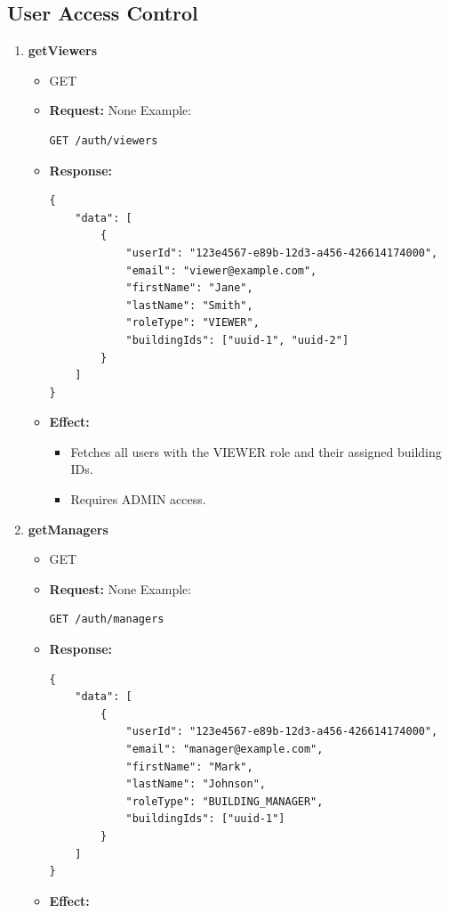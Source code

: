 \documentclass[12pt, a4paper]{article}
\begin{document}
\subsection{User Access Control}
\begin{enumerate}
    \item \textbf{getViewers}
    \begin{itemize}
        \item GET
        \item \textbf{Request:} None
        Example:
        \begin{verbatim}
GET /auth/viewers
        \end{verbatim}
        \item \textbf{Response:}
        \begin{verbatim}
{
    "data": [
        {
            "userId": "123e4567-e89b-12d3-a456-426614174000",
            "email": "viewer@example.com",
            "firstName": "Jane",
            "lastName": "Smith",
            "roleType": "VIEWER",
            "buildingIds": ["uuid-1", "uuid-2"]
        }
    ]
}
        \end{verbatim}
        \item \textbf{Effect:}
        \begin{itemize}
            \item Fetches all users with the VIEWER role and their assigned building IDs.
            \item Requires ADMIN access.
        \end{itemize}
    \end{itemize}
    \item \textbf{getManagers}
    \begin{itemize}
        \item GET 
        \item \textbf{Request:} None
        Example:
        \begin{verbatim}
GET /auth/managers
        \end{verbatim}
        \item \textbf{Response:}
        \begin{verbatim}
{
    "data": [
        {
            "userId": "123e4567-e89b-12d3-a456-426614174000",
            "email": "manager@example.com",
            "firstName": "Mark",
            "lastName": "Johnson",
            "roleType": "BUILDING_MANAGER",
            "buildingIds": ["uuid-1"]
        }
    ]
}
        \end{verbatim}
        \item \textbf{Effect:}

\end{itemize}
\end{enumerate}
\end{document}
